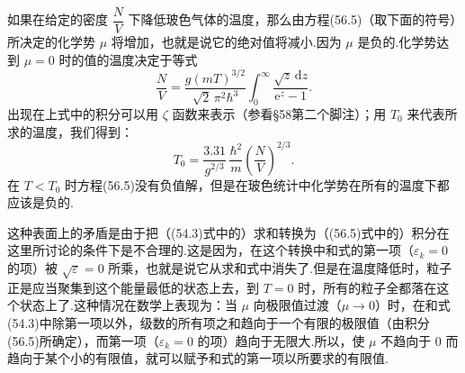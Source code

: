如果在给定的密度 $\dfrac{N}{V}$ 下降低玻色气体的温度，那么由方程(56.5)（取下面的符号）所决定的化学势 $\mu$ 将增加，也就是说它的绝对值将减小.因为 $\mu$ 是负的.化学势达到 $\mu=0$ 时的值的温度决定于等式
\begin{equation}
  \frac{N}{V}=\frac{g(mT)^{3/2}}{\sqrt{2}\,\pi^2\hbar^3}\int_0^{\infty}
  \frac{\sqrt{z}\,\mathrm{d}z}{\mathrm{e}^z-1}.
\end{equation}
出现在上式中的积分可以用 $\zeta$ 函数来表示（参看§58第二个脚注）；用 $T_0$ 来代表所求的温度，我们得到：
\begin{equation}
  T_0=\frac{3.31}{g^{2/3}}\,\frac{\hbar^2}{m}\left(\frac{N}{V}\right)^{2/3}.
\end{equation}
在 $T<T_0$ 时方程(56.5)没有负值解，但是在玻色统计中化学势在所有的温度下都应该是负的.

这种表面上的矛盾是由于把（(54.3)式中的）求和转换为（(56.5)式中的）积分在这里所讨论的条件下是不合理的.这是因为，在这个转换中和式的第一项（$\varepsilon_k=0$ 的项）被 $\sqrt{\varepsilon}=0$ 所乘，也就是说它从求和式中消失了.但是在温度降低时，粒子正是应当聚集到这个能量最低的状态上去，到 $T=0$ 时，所有的粒子全都落在这个状态上了.这种情况在数学上表现为：当 $\mu$ 向极限值过渡（$\mu\to0$）时，在和式(54.3)中除第一项以外，级数的所有项之和趋向于一个有限的极限值（由积分(56.5)所确定），而第一项（$\varepsilon_k=0$ 的项）趋向于无限大.所以，使 $\mu$ 不趋向于 0 而趋向于某个小的有限值，就可以赋予和式的第一项以所要求的有限值.

